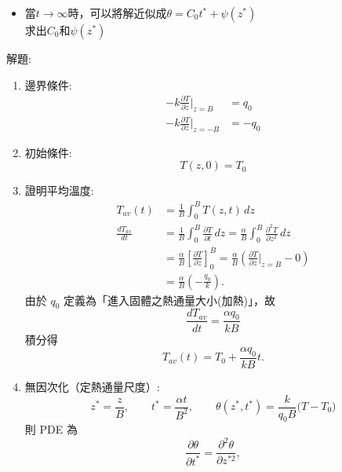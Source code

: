 \documentclass[../main.tex]{subfiles}
\begin{document}
\begin{itemize}
\begin{itemize}
\begin{equation}
      T_{av}(t) = \frac{1}{B}\int_0^B T(z,t) dz
    \end{equation}
    \item 當$t\to\infty$時，可以將解近似成$\theta = C_0t^\ast +\psi(z^\ast)$\\
    求出$C_0$和$\psi(z^\ast)$
  \end{itemize}
  解題:
  \begin{enumerate}
    \item 邊界條件:
    \begin{align}
      -k \frac{\partial T}{\partial z}\Big|_{z=B} &= q_0\\
      -k \frac{\partial T}{\partial z}\Big|_{z=-B} &= -q_0
    \end{align}
    \item 初始條件:
    \begin{equation}
      T(z,0)=T_0
    \end{equation}
    \item 證明平均溫度:
    \begin{align}
      T_{av}(t) &= \frac{1}{B}\int_0^B T(z,t)\,dz \nonumber\\
      \frac{dT_{av}}{dt}
        &=\frac{1}{B}\int_0^B \frac{\partial T}{\partial t}\,dz
        =\frac{\alpha}{B}\int_0^B \frac{\partial^2 T}{\partial z^2}\,dz \nonumber\\
        &=\frac{\alpha}{B}\left[\frac{\partial T}{\partial z}\right]_0^B
        =\frac{\alpha}{B}\left(\frac{\partial T}{\partial z}\Big|_{z=B}-0\right) \nonumber\\
        &=\frac{\alpha}{B}\left(-\frac{q_0}{k}\right).
    \end{align}
    由於 $q_0$ 定義為「進入固體之熱通量大小(加熱)」，故
    \begin{equation}
      \boxed{\frac{dT_{av}}{dt}=\frac{\alpha q_0}{kB}}
    \end{equation}
    積分得
    \begin{equation}
      \boxed{T_{av}(t)=T_0+\frac{\alpha q_0}{kB}t.}
    \end{equation}
    \item 無因次化（定熱通量尺度）:
    \begin{equation}
      z^\ast=\frac{z}{B},\qquad t^\ast=\frac{\alpha t}{B^2},\qquad
      \theta(z^\ast,t^\ast)=\frac{k}{q_0B}\bigl(T-T_0\bigr)
    \end{equation}
    則 PDE 為
    \begin{equation}
      \frac{\partial \theta}{\partial t^\ast}=\frac{\partial^2 \theta}{\partial z^{\ast2}},

\end{equation}
\end{enumerate}
\end{itemize}
\end{document}
